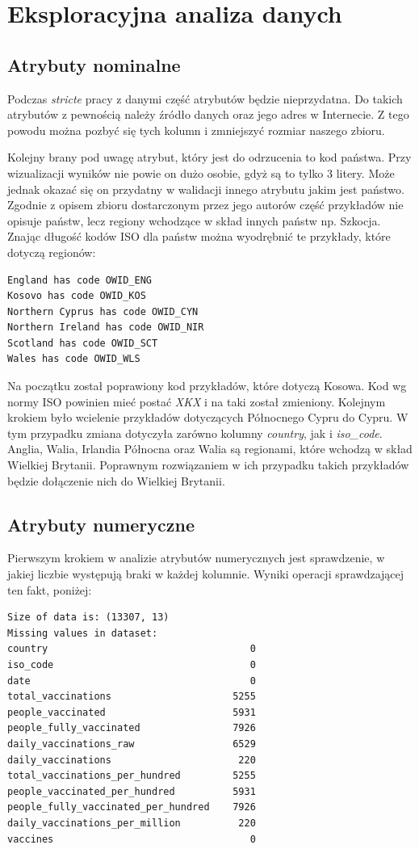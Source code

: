 \documentclass[12pt, oneside]{article}
\begin{document}
\section{Eksploracyjna analiza danych}


\subsection{Atrybuty nominalne}

Podczas \textit{stricte} pracy z danymi część atrybutów będzie nieprzydatna. Do takich atrybutów z pewnością należy źródło danych oraz jego adres w Internecie. Z tego powodu można pozbyć się tych kolumn i zmniejszyć rozmiar naszego zbioru.

Kolejny brany pod uwagę atrybut, który jest do odrzucenia to kod państwa. Przy wizualizacji wyników nie powie on dużo osobie, gdyż są to tylko 3 litery. Może jednak okazać się on przydatny w walidacji innego atrybutu jakim jest państwo. Zgodnie z opisem zbioru dostarczonym przez jego autorów część przykładów nie opisuje państw, lecz regiony wchodzące w skład innych państw np. Szkocja. Znając długość kodów ISO dla państw można wyodrębnić te przykłady, które dotyczą regionów:
\begin{verbatim}
England has code OWID_ENG
Kosovo has code OWID_KOS
Northern Cyprus has code OWID_CYN
Northern Ireland has code OWID_NIR
Scotland has code OWID_SCT
Wales has code OWID_WLS
\end{verbatim}

Na początku został poprawiony kod przykładów, które dotyczą Kosowa. Kod wg normy ISO powinien mieć postać \textit{XKX} i na taki został zmieniony. Kolejnym krokiem było wcielenie przykładów dotyczących Północnego Cypru do Cypru. W tym przypadku zmiana dotyczyła zarówno kolumny \textit{country}, jak i \textit{iso\_code}. Anglia, Walia, Irlandia Północna oraz Walia są regionami, które wchodzą w skład Wielkiej Brytanii. Poprawnym rozwiązaniem w ich przypadku takich przykładów będzie dołączenie nich do Wielkiej Brytanii.

\subsection{Atrybuty numeryczne}

Pierwszym krokiem w analizie atrybutów numerycznych jest sprawdzenie, w jakiej liczbie występują braki w każdej kolumnie. Wyniki operacji sprawdzającej ten fakt, poniżej:

\begin{verbatim}
Size of data is: (13307, 13)
Missing values in dataset: 
country                                   0
iso_code                                  0
date                                      0
total_vaccinations                     5255
people_vaccinated                      5931
people_fully_vaccinated                7926
daily_vaccinations_raw                 6529
daily_vaccinations                      220
total_vaccinations_per_hundred         5255
people_vaccinated_per_hundred          5931
people_fully_vaccinated_per_hundred    7926
daily_vaccinations_per_million          220
vaccines                                  0
\end{verbatim}
\end{document}
